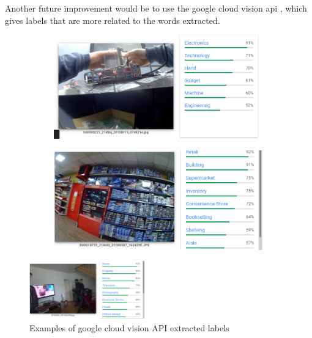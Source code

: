Another future improvement would be to use the google cloud vision api \cite{google}, which gives labels that are more related to the words extracted. 


\begin{figure}[H]
    \centering
    \captionsetup{justification=centering}
    \begin{subfigure}{0.45\textwidth}
    \includegraphics[width=\textwidth]{Sections/8Conclusion/images/google.png} 
  
    \end{subfigure}
    \begin{subfigure}{0.45\textwidth}
    \includegraphics[width=\textwidth]{Sections/8Conclusion/images/labels.png}
    \end{subfigure}

  \end{figure}


\begin{figure}[H]
    \centering
    \captionsetup{justification=centering}

    \includegraphics[width=0.45\textwidth]{Sections/8Conclusion/images/google_labels_2.png}
    
    \caption[Google cloud vision API labels]{Examples of google cloud vision API extracted labels \cite{google}}
\end{figure}
